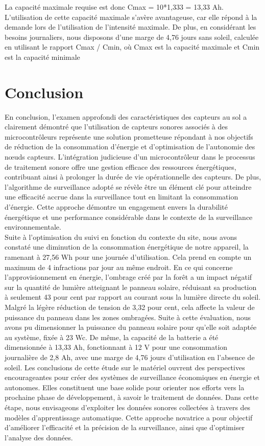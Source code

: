 La capacité maximale requise est donc Cmax = 10*1,333 = 13,33 Ah.\\
L'utilisation de cette capacité maximale s'avère avantageuse, car elle répond à la demande lors de l'utilisation de l'intensité maximale. De plus, en considérant les besoins journaliers, nous disposons d'une marge de 4,76 jours sans soleil, calculée en utilisant le rapport Cmax / Cmin, où Cmax est la capacité maximale et Cmin est la capacité minimale

\section{Conclusion}
En conclusion, l'examen approfondi des caractéristiques des capteurs au sol a clairement démontré que l'utilisation de capteurs sonores associés à des microcontrôleurs représente une solution prometteuse répondant à nos objectifs de réduction de la consommation d'énergie et d'optimisation de l'autonomie des nœuds capteurs. L'intégration judicieuse d'un microcontrôleur dans le processus de traitement sonore offre une gestion efficace des ressources énergétiques, contribuant ainsi à prolonger la durée de vie opérationnelle des capteurs. De plus, l'algorithme de surveillance adopté se révèle être un élément clé pour atteindre une efficacité accrue dans la surveillance tout en limitant la consommation d'énergie. Cette approche démontre un engagement envers la durabilité énergétique et une performance considérable dans le contexte de la surveillance environnementale.
\\

Suite à l'optimisation du suivi en fonction du contexte du site, nous avons constaté une diminution de la consommation énergétique de notre appareil, la ramenant à 27,56 Wh pour une journée d'utilisation. Cela prend en compte un maximum de 4 infractions par jour au même endroit. En ce qui concerne l'approvisionnement en énergie, l'ombrage créé par la forêt a un impact négatif sur la quantité de lumière atteignant le panneau solaire, réduisant sa production à seulement 43 pour cent par rapport au courant sous la lumière directe du soleil. Malgré la légère réduction de tension de 3,32 pour cent, cela affecte la valeur de puissance du panneau dans les zones ombragées. Suite à cette évaluation, nous avons pu dimensionner la puissance du panneau solaire pour qu’elle soit adaptée au système, fixée à 23 Wc. De même, la capacité de la batterie a été dimensionnée à 13,33 Ah, fonctionnant à 12 V pour une consommation journalière de 2,8 Ah, avec une marge de 4,76 jours d’utilisation en l’absence de soleil.
Les conclusions de cette étude sur le matériel ouvrent des perspectives encourageantes pour créer des systèmes de surveillance économiques en énergie et autonomes. Elles constituent une base solide pour orienter nos efforts vers la prochaine phase de développement, à savoir le traitement de données. Dans cette étape, nous envisageons d'exploiter les données sonores collectées à travers des modèles d'apprentissage automatique. Cette approche novatrice a pour objectif d'améliorer l'efficacité et la précision de la surveillance, ainsi que d'optimiser l'analyse des données. 

